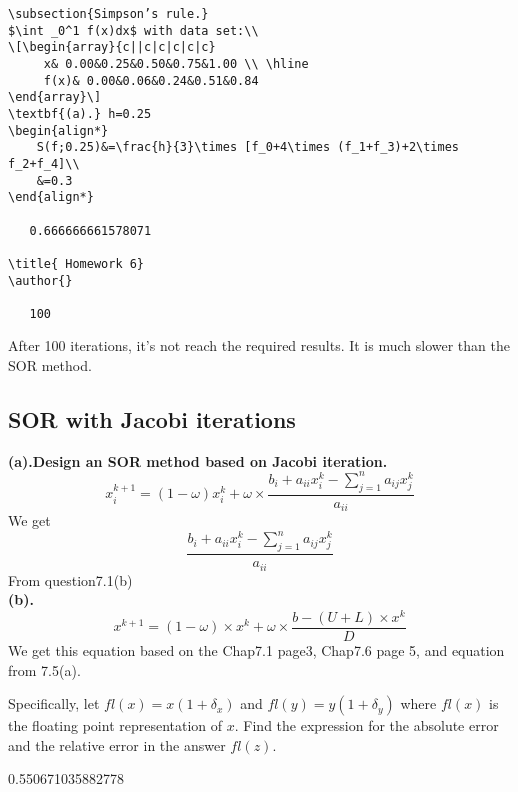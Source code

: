 \begin{verbatim}
\subsection{Simpson’s rule.}
$\int _0^1 f(x)dx$ with data set:\\
\[\begin{array}{c||c|c|c|c|c}
     x& 0.00&0.25&0.50&0.75&1.00 \\ \hline
     f(x)& 0.00&0.06&0.24&0.51&0.84
\end{array}\]
\textbf{(a).} h=0.25
\begin{align*}
    S(f;0.25)&=\frac{h}{3}\times [f_0+4\times (f_1+f_3)+2\times f_2+f_4]\\
    &=0.3
\end{align*}

   0.666666661578071

\title{ Homework 6}
\author{}

   100
\end{verbatim}
After 100 iterations, it's not reach the required results. It is much slower than the SOR method.
\newpage
\subsection{SOR with Jacobi iterations}
\textbf{(a).Design an SOR method based on Jacobi iteration.}
\[x_i^{k+1}=(1-\omega)x_i^k+\omega\times\frac{b_i+a_{ii}x_i^k-\sum^n_{j=1}{a_{ij}x_j^k}}{a_{ii}}\]
We get \[\frac{b_i+a_{ii}x_i^k-\sum^n_{j=1}{a_{ij}x_j^k}}{a_{ii}}\] From question7.1(b)\\
\textbf{(b).}
\[x^{k+1}=(1-\omega)\times x^k+\omega\times \frac{b-(U+L)\times x^k}{D}\]
We get this equation based on the Chap7.1 page3, Chap7.6 page 5, and equation from 7.5(a).


Specifically, 
let $fl(x)=x(1+\delta_x)$ and $fl(y)=y(1+\delta_y)$ 
where $fl(x)$ is the floating point representation of $x$. 
Find the expression for the absolute error and the relative error in the answer $fl(z)$.

   0.550671035882778

